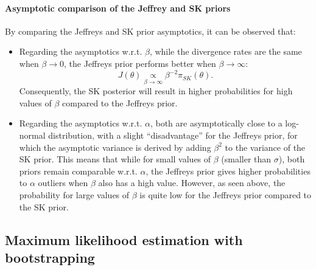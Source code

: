 \paragraph{Asymptotic comparison of the Jeffrey and SK priors} 
By comparing the Jeffreys and SK prior asymptotics, it can be observed that:
    \begin{itemize}
        \item Regarding the asymptotics w.r.t. $\beta$, while the divergence rates are the same when $\beta\to0$, the Jeffreys prior performs better when $\beta\to\infty$:
            \begin{equation}
                J(\theta) \underset{\beta\rightarrow\infty}{\propto} \beta^{-2}\pi_{SK}(\theta).
            \end{equation}
        Consequently, the SK posterior will result in higher probabilities for high values of $\beta$ compared to the Jeffreys prior.
        \item Regarding the asymptotics w.r.t. $\alpha$, both are asymptotically close to a log-normal distribution, with a slight ``disadvantage'' for the Jeffreys prior, for which the asymptotic variance is derived by adding $\beta^2$ to the variance of the SK prior. This means that while for small values of $\beta$ (smaller than $\sigma$), both priors remain comparable w.r.t. $\alpha$, the Jeffreys prior gives higher probabilities to $\alpha$ outliers when $\beta$ also has a high value. However, as seen above, the probability for large values of $\beta$ is quite low for the Jeffreys prior compared to the SK prior. %
    \end{itemize}


%


    \subsection{Maximum likelihood estimation with bootstrapping}

